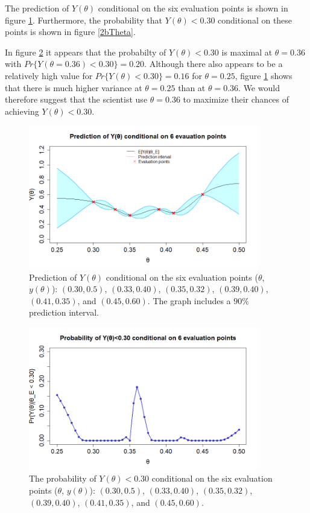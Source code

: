 The prediction of $Y(\theta)$ conditional on the six evaluation points is shown in figure \ref{2cPred}. Furthermore, the probability that $Y(\theta)<0.30$ conditional on these points is shown in figure \ref{2bTheta}. 

In figure \ref{2cTheta} it appears that the probabilty of $Y(\theta)<0.30$  is maximal at $\theta = 0.36$ with $Pr\{Y(\theta=0.36)<0.30\}=0.20$. Although there also appears to be a relatively high value for $Pr\{Y(\theta)<0.30\}=0.16$ for $\theta=0.25$, figure \ref{2cPred} shows that there is much higher variance at $\theta=0.25$ than at $\theta = 0.36$. We would therefore suggest that the scientist use $\theta = 0.36$ to maximize their chances of achieving $Y(\theta)<0.30$.

\begin{figure}
    \centering
    \includegraphics[width=100mm]{2cPred.png}
    \caption{Prediction of $Y(\theta)$ conditional on the six evaluation points  ($\theta$, $y(\theta)$): $(0.30,0.5)$, $(0.33, 0.40)$, $(0.35,0.32)$, $(0.39,0.40)$, $(0.41,0.35)$, and $(0.45,0.60)$. The graph includes a $90\%$ prediction interval. }
    \label{2cPred}
\end{figure}
\begin{figure}
    \centering
    \includegraphics[width=100mm]{2ctheta.png}
    \caption{The probability of $Y(\theta)<0.30$ conditional on the six evaluation points ($\theta$, $y(\theta)$): $(0.30,0.5)$, $(0.33, 0.40)$, $(0.35,0.32)$, $(0.39,0.40)$, $(0.41,0.35)$, and $(0.45,0.60)$.}
    \label{2cTheta}
\end{figure}
